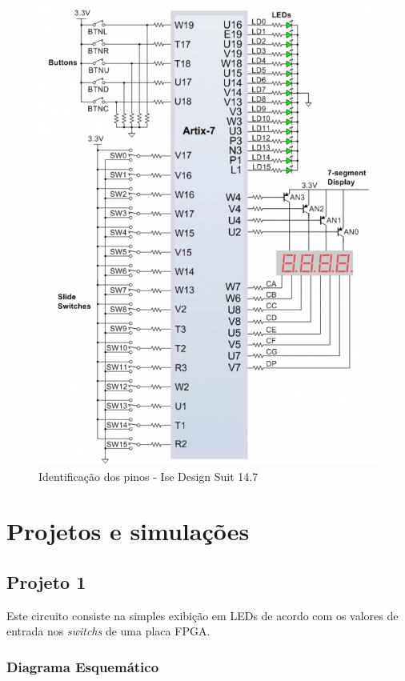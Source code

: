 \documentclass[12pts]{article}
\begin{document}
\begin{figure}[!htb]
  \centering
  \includegraphics[scale=0.3]{imagens/identificacaoPinos.png}
  \caption{Identificação dos pinos - Ise Design Suit 14.7}
  \label{figRotulo}
\end{figure}


\section{Projetos e simulações}

\subsection{Projeto 1}

Este circuito consiste na simples exibição em LEDs de acordo com os valores de entrada nos \textit{switchs} de uma placa FPGA.

\subsubsection{Diagrama Esquemático}
\end{document}
